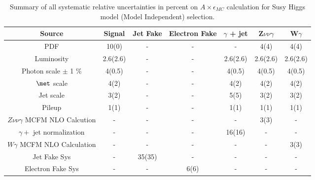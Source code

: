 \begin{table}[htbp]
\centering
\begin{tabular}{|c|c|c|c|c|c|c|}
\hline
Source   & Signal & Jet Fake & Electron Fake & $\gamma$ + jet & Z$\nu\nu\gamma$ & W$\gamma$ \\
\hline
PDF & 10(0) & - & - & - & 4(4) & 4(4) \\
\hline
Luminosity & 2.6(2.6) & - & - & 2.6(2.6) & 2.6(2.6) & 2.6(2.6) \\
\hline
Photon scale $\pm$ 1 $\%$  & 4(0.5) & - & - & 4(0.5) & 4(0.5) & 4(0.5) \\
\hline
$\met$ scale & 4(2) & - & - & 4(2) & 4(2) & 4(2) \\
\hline
Jet scale & 3(2) & - & - & 5(5) & 3(2) & 3(2) \\
\hline
Pileup  &  1(1) & - & - & 1(1) & 1(1) & 1(1) \\
\hline
$Z\nu\nu\gamma$ MCFM NLO Calcution & - & - & - & - & 3(3) & - \\
\hline
$\gamma +$ jet normalization  & - & - & - & 16(16) & - & - \\
\hline
$W\gamma$ MCFM NLO Calculation & - & - & - & - & - & 3(3) \\
\hline
Jet Fake Sys   & - & 35(35) & - & - & - & - \\
\hline
Electron Fake Sys   & - & - & 6(6) & - & - & - \\
\hline
\end{tabular}
\caption{Summary of all systematic relative uncertainties in percent on $A\times \epsilon_{MC}$ calculation for Susy Higgs model (Model Independent) selection. }
\label{tab:sys}
\end{table}
